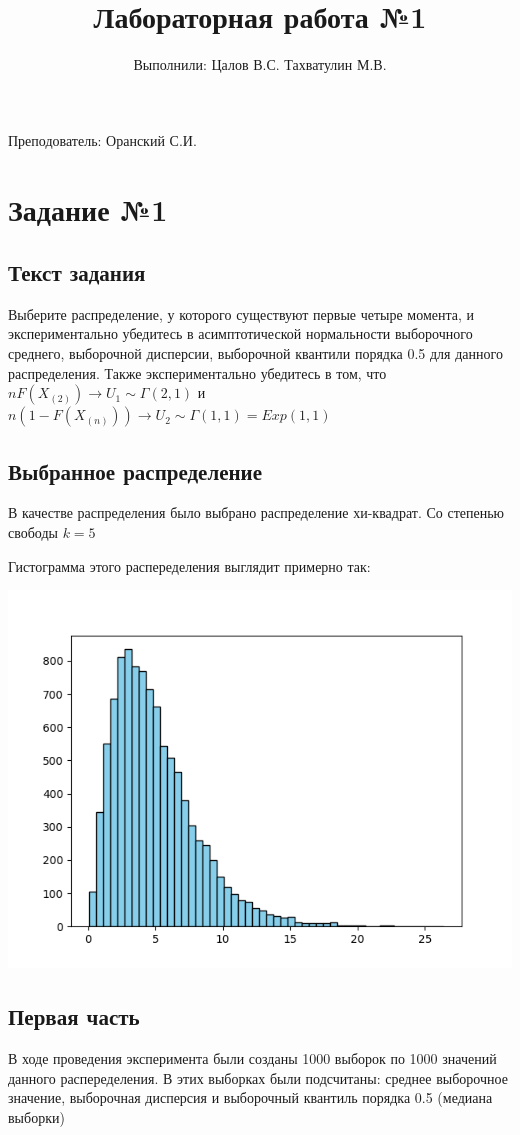 \documentclass{article}
\title{Лабораторная работа №1}
\author{Выполнили: Цалов В.С. Тахватулин М.В.}
\begin{document}
\maketitle
\begin{center}
      {\fontsize{14}{15}\selectfont
            Преподователь: Оранский С.И.
      }
\end{center}


\section{Задание №1}\label{sec:-no1}

\subsection{Текст задания}

Выберите распределение, у которого существуют первые четыре момента, и экспериментально убедитесь в асимптотической нормальности выборочного среднего, выборочной дисперсии,
выборочной квантили порядка 0.5 для данного распределения. Также экспериментально убедитесь в том, что $nF(X_{(2)}) \rightarrow U_1 \sim \Gamma(2, 1)$ и $n(1 - F(X_{(n)})) \rightarrow U_2 \sim \Gamma(1, 1) = Exp(1,1)$

\subsection{Выбранное распределение}\label{subsec:-}

В качестве распределения было выбрано распределение хи-квадрат. Со степенью свободы $k = 5$

Гистограмма этого распеределения выглядит примерно так:

\begin{center}
      \centering
      \includegraphics[width=0.5\linewidth]{Python/chi}
\end{center}

\subsection{Первая часть}\label{subsec:-2}
В ходе проведения эксперимента были созданы 1000 выборок по 1000 значений данного распеределения.
В этих выборках были подсчитаны: среднее выборочное значение, выборочная дисперсия и выборочный квантиль порядка 0.5 (медиана выборки)
\end{document}
